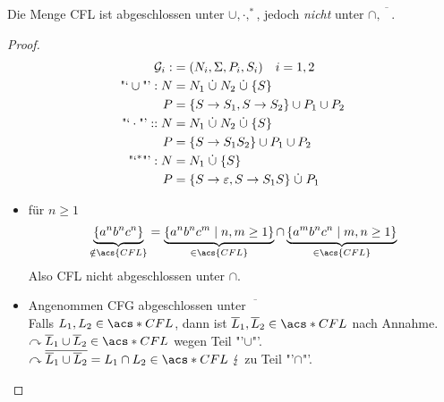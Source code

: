 \begin{Satz} %
	Die Menge \acs{CFL} ist abgeschlossen unter $\cup, \cdot, ^*$, jedoch \emph{nicht} unter $\cap, \overline{\phantom{A}}$.
\end{Satz}
\begin{proof}
	\begin{align*}
		\mathcal{G}_i :&= (N_i, \Sigma,P_i,S_i) \quad i=1,2\\
		\text{"`}\cup\text{"'}: N &= N_1\dotcup N_2\dotcup\{S\}\\
		P &= \{S\->S_1, S\->S_2 \} \cup P_1\cup P_2\\
		\text{"`}\cdot\text{"'}:: N &= N_1\dotcup N_2\dotcup\{S\}\\
		P &= \{ S\->S_1S_2 \} \cup P_1\cup P_2\\
		\text{"`}^*\text{"'}: N &= N_1 \dotcup \{S\}\\
		P &= \{ S\->\Eps, S\-> S_1S \} \dotcup P_1
	\end{align*}
	\begin{itemize}
	\item für $n\geq 1$
		\[ \underbrace{\{a^nb^nc^n\}}_{\notin \acs{CFL}} = \underbrace{\{a^nb^nc^m \mid n,m\geq 1 \}}_{\in \acs{CFL}} \cap \underbrace{\{a^mb^nc^n \mid m,n\geq 1 \}}_{\in \acs{CFL}} \]
		Also \ac{CFL} nicht abgeschlossen unter $\cap$.
	\item Angenommen \ac{CFG} abgeschlossen unter $\overline{\phantom{X}}$\\
		Falls $L_1,L_2\in \acs*{CFL}$, dann ist $\overline{L}_1,\overline{L}_2\in\acs*{CFL}$ nach Annahme.\\
		$\curvearrowright \overline{L}_1\cup \overline{L}_2\in\acs*{CFL}$ wegen Teil "'$\cup$"'.\\
		$\curvearrowright \overline{\overline{L}_1\cup \overline{L}_2} = L_1\cap L_2\in\acs*{CFL}\ \lightning$ zu Teil "'$\cap$"'. \qedhere
	\end{itemize}
\end{proof}

